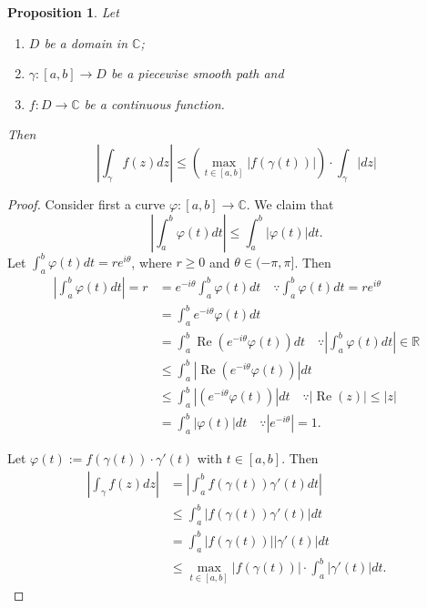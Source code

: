 \documentclass[12pt,openany]{book}
\newtheorem{proposition}[theorem]{Proposition}
\theoremstyle{definition}
\newcommand{\R}{\mathbb{R}}
\newcommand{\C}{\mathbb{C}}
\newcommand{\of}[1]{\left( #1 \right)}
\newcommand{\abs}[1]{\left\lvert #1 \right\rvert}
\renewcommand{\Re}{\operatorname{Re}}
\begin{document}
	\vspace{8pt}
	\begin{tcolorbox}[colback=white,colframe=procolor,arc=5pt,title={\color{white}\bf }]
		\begin{proposition}
			Let \begin{enumerate}
				\item $D$ be a domain in $\C$;
				\item $\gamma:[a,b]\to D$ be a piecewise smooth path and
				\item $f:D\to\C$ be a continuous function.
			\end{enumerate} Then \[
			\abs{\int_\gamma f\of{z}dz}\leq\of{\max_{t\in[a,b]}\abs{f\of{\gamma\of{t}}}}\cdot\int_\gamma\abs{dz}
			\]
		\end{proposition}
	\end{tcolorbox}
	\begin{proof}
		Consider first a curve $\varphi:[a,b]\to\C$. We claim that \[
		\abs{\int_a^b\varphi\of{t}dt}\leq\int_a^b\abs{\varphi\of{t}}dt.
		\] Let $\displaystyle\int_a^b\varphi\of{t}dt=re^{i\theta}$, where $r\geq 0$ and $\theta\in(-\pi,\pi]$. Then \begin{align*}
		\abs{\int_a^b\varphi\of{t}dt}=r
		&=e^{-i\theta}\int_a^b\varphi\of{t}dt\quad\because\int_a^b\varphi\of{t}dt=re^{i\theta}\\
		&=\int_a^be^{-i\theta}\varphi\of{t}dt\\
		&=\int_a^b\Re\of{e^{-i\theta}\varphi\of{t}}dt\quad\because\abs{\int_a^b\varphi\of{t}dt}\in\R\\
		&\leq\int_a^b\abs{\Re\of{e^{-i\theta}\varphi\of{t}}}dt \\
		&\leq\int_a^b\abs{\of{e^{-i\theta}\varphi\of{t}}}dt\quad\because\abs{\Re\of{z}}\leq\abs{z}\\
		&=\int_a^b\abs{\varphi\of{t}}dt\quad\because \abs{e^{-i\theta}}=1.
		\end{align*}
		
		Let $\varphi\of{t}:=f\of{\gamma\of{t}}\cdot\gamma'\of{t}$ with $t\in[a,b]$. Then
		\begin{align*}
		\abs{\int_\gamma f\of{z}dz}&=\abs{\int_a^b f\of{\gamma\of{t}}\gamma'\of{t}dt}\\
		&\leq{\int_a^b \abs{f\of{\gamma\of{t}}\gamma'\of{t}}dt}\\
		&=\int_a^b\abs{f\of{\gamma\of{t}}}\abs{\gamma'\of{t}}dt\\
		&\leq\max_{t\in[a,b]}\abs{f\of{\gamma\of{t}}}\cdot\int_a^b\abs{\gamma'\of{t}}dt.
		\end{align*}
	\end{proof}
	
\end{document}
